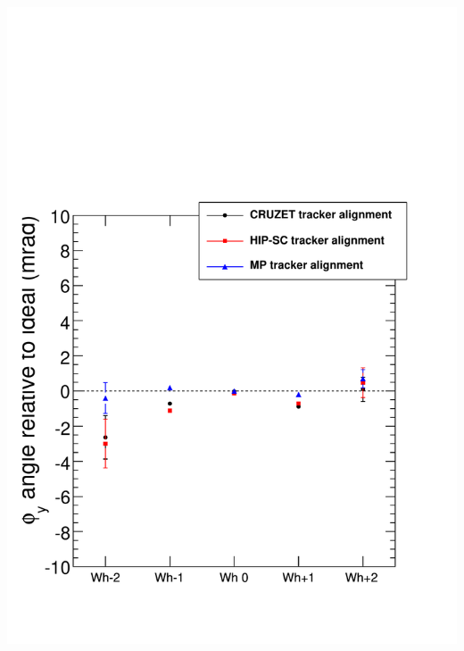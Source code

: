 \documentclass[compress]{beamer}
\begin{document}
\begin{frame}
{\begin{columns}
\includegraphics[width=\linewidth]{compare_tracker_alignment_phiy.pdf}
\end{columns}}
\end{frame}
\end{document}
